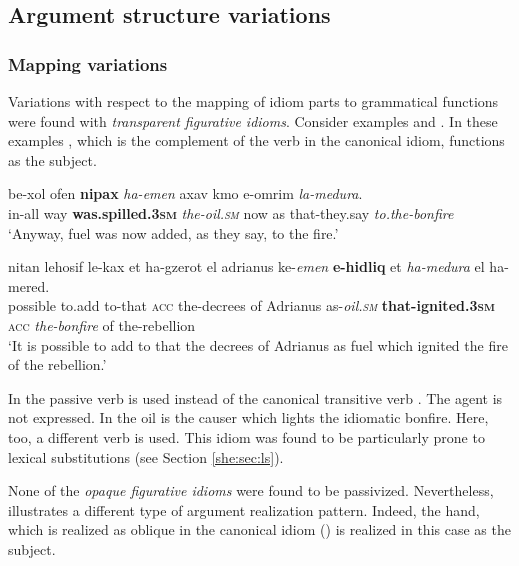 \documentclass[output=paper]{langsci/langscibook}
\begin{document}
\subsection{Argument structure variations}
\label{she:sec:asv}

\subsubsection{Mapping variations}
\label{she:sec:mapping}


Variations with respect to the mapping of idiom parts to grammatical functions were found with \textit{transparent figurative idioms}. Consider examples  and . In these examples , which is the complement of the verb in the canonical idiom, functions as the subject.

	\ea\label{she:medura-passive}
    	\gll be-xol {\alef}ofen \textbf{ni{\shinB}pax} \textit{ha-{\shin}emen} {\ayin}ax{\shin}av kmo {\shin}e-{\alef}omrim \textit{la-medura}.\\
    	   in-all way \textbf{was.spilled.\textsc{3sm}} \textit{the-oil.\textsc{sm}} now as that-they.say \textit{to.the-bonfire}\\
    	\glt `Anyway, fuel was now added, as they say, to the fire.'
	\z

	\ea\label{she:medura-rev}
    	\gll nitan lehosif le-kax {\alef}et ha-gzerot {\shin}el {\alef}adri{\alef}anus ke-\textit{{\shin}emen} \textbf{{\shinB}e-hidliq} {\alef}et \textit{ha-medura} {\shin}el ha-mered.\\
    	   possible to.add to-that \textsc{acc} the-decrees of Adrianus as-\textit{oil.\textsc{sm}} \textbf{that-ignited.\textsc{3sm}} \textsc{acc} \textit{the-bonfire} of the-rebellion \\
    	\glt `It is possible to add to that the decrees of Adrianus as fuel which ignited the fire of the rebellion.'
	\z

In  the passive verb  is used instead of the canonical transitive verb . The agent is not expressed. In  the oil is the causer which lights the idiomatic bonfire. Here, too, a different verb is used. This idiom was found to be particularly prone to lexical substitutions (see Section \ref{she:sec:ls}).

None of the \textit{opaque figurative idioms} were found to be passivized. Nevertheless,  illustrates a different type of argument realization pattern. Indeed, the hand, which is realized as oblique in the canonical idiom () is realized in this case as the subject.
\end{document}
